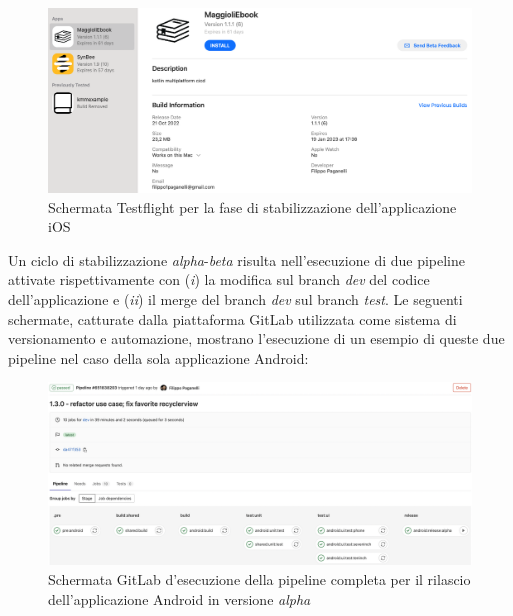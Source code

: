 \begin{figure}[H]
    \centering
    \includegraphics[width=1\textwidth]{img/testflight-maggioliebook.png}
    \caption{Schermata Testflight per la fase di stabilizzazione dell'applicazione iOS}
    \label{testflight-maggioliebook}
\end{figure}

Un ciclo di stabilizzazione \textit{alpha}-\textit{beta} risulta nell'esecuzione di due pipeline attivate rispettivamente con (\textit{i}) la modifica sul branch \textit{dev} del codice dell'applicazione e (\textit{ii}) il merge del branch \textit{dev} sul branch \textit{test}. 
Le seguenti schermate, 
catturate dalla piattaforma GitLab utilizzata come sistema di versionamento e automazione, 
mostrano l'esecuzione di un esempio di queste due pipeline nel caso della sola applicazione Android:

\begin{figure}[H]
\centering
    \includegraphics[width=1\textwidth]{img/gitlab-pipeline-android-alpha.png}
    \caption{Schermata GitLab d'esecuzione della pipeline completa per il rilascio dell'applicazione Android in versione \textit{alpha}}
    \label{gitlab-pipeline-android-alpha}
\end{figure}

